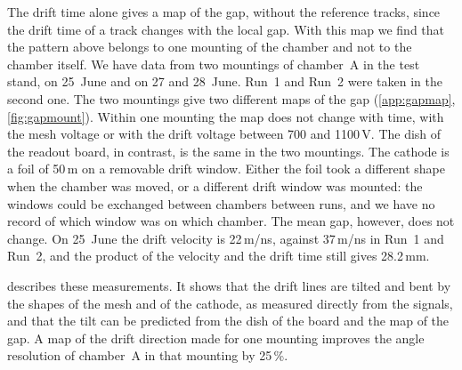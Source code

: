 The drift time alone gives a map of the gap, without the reference tracks, since the drift time of a track changes
with the local gap. With this map we find that the pattern above belongs to one mounting of the chamber and not to the
chamber itself. We have data from two mountings of chamber~A in the test stand, on 25~June and on 27 and
28~June. Run~1 and Run~2 were taken in the second one. The two mountings give two different maps of the gap
(\cref{app:gapmap}, \cref{fig:gapmount}). Within one mounting the map does not change with time, with the mesh voltage
or with the drift voltage between 700 and 1100\,V. The dish of the readout board, in contrast, is the same in the two
mountings. The cathode is a foil of 50\,\textmu m on a removable drift window. Either the foil took a different shape
when the chamber was moved, or a different drift window was mounted: the windows could be exchanged between chambers
between runs, and we have no record of which window was on which chamber. The mean gap, however, does not change. On 25~June the drift velocity is
22\,\textmu m/ns, against 37\,\textmu m/ns in Run~1 and Run~2, and the product of the velocity and the drift time
still gives 28.2\,mm.

 describes these measurements. It shows that the drift lines are tilted and bent by the shapes of
the mesh and of the cathode, as measured directly from the signals, and that the tilt can be predicted from the dish
of the board and the map of the gap. A map of the drift direction made for one mounting improves the angle resolution
of chamber~A in that mounting by 25\,\%.

